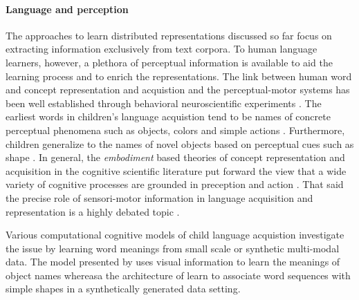 \paragraph{Language and perception}
The approaches to learn distributed representations discussed so far focus on extracting information exclusively
from text corpora. To human language learners, however, a plethora of perceptual information is available to aid the
learning process and to enrich the representations. The link between human word and concept representation
and acquistion and the perceptual-motor systems has been well established through behavioral
neuroscientific experiments \cite{pulvermuller2005brain}.
The earliest words in children's language acquistion tend to be names of concrete perceptual phenomena
such as objects, colors and simple actions \cite{bornstein2004cross}. Furthermore, children generalize to
the names of novel objects based on perceptual cues such as shape \cite{landau1998object}.
In general, the \emph{embodiment} based theories of concept representation and acquisition in the
cognitive scientific literature put forward the view that a wide variety of cognitive processes
are grounded in preception and action \cite{meteyard2008role}. That said the precise role of
sensori-motor information in language acquisition and representation is a highly
debated topic \cite{meteyard2012coming}.

Various computational cognitive models of child language acquistion investigate the issue
by learning word meanings from small scale or synthetic multi-modal data. The model presented by
\cite{yu2005emergence} uses visual information to learn the meanings of object
names whereasa the architecture of \cite{roy2002learning} learn to associate word sequences
with simple shapes in a synthetically generated data setting.

